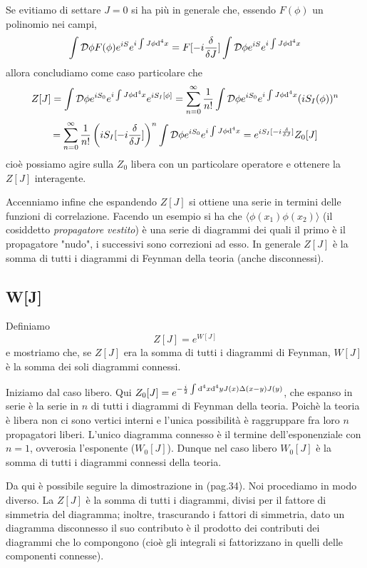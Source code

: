 \documentclass[a4paper, 11pt]{article}
\begin{document}
	Se evitiamo di settare $J=0$ si ha più in generale che, essendo $F(\phi)$ un polinomio nei campi,
	\[ \int \mathcal{D}\phi F(\phi) e^{iS}e^{i\int J\phi \mathrm{d}^4x} = F[-i\frac{\delta}{\delta J}] \int \mathcal{D}\phi e^{iS}e^{i\int J \phi \mathrm{d}^4x} \]
	allora concludiamo come caso particolare che
	\[ Z[J] = \int \mathcal{D}\phi e^{iS_0}e^{i\int J\phi \mathrm{d}^4x} e^{iS_I[\phi]} = \sum_{n=0}^{\infty} \frac{1}{n!} \int \mathcal{D}\phi e^{iS_0}e^{i\int J\phi \mathrm{d}^4x} (iS_I(\phi))^n \]
	\[ = \sum_{n=0}^{\infty} \frac{1}{n!} \left(iS_I[-i\frac{\delta}{\delta J}]\right)^n \int \mathcal{D}\phi e^{iS_0}e^{i\int J\phi \mathrm{d}^4x} = 
	e^{iS_I[-i\frac{\delta}{\delta J}]} Z_0[J] \]
	cioè possiamo agire sulla $Z_0$ libera con un particolare operatore e ottenere la $Z[J]$ interagente.
	
	Accenniamo infine che espandendo $Z[J]$ si ottiene una serie in termini delle funzioni di correlazione. Facendo un esempio si ha che $\langle \phi(x_1) \phi(x_2)\rangle$ (il cosiddetto \emph{propagatore vestito}) è una serie di diagrammi dei quali il primo è il propagatore "nudo", i successivi sono correzioni ad esso. In generale $Z[J]$ è la somma di tutti i diagrammi di Feynman della teoria (anche disconnessi).
	
	\subsection{W[J]}
	Definiamo
	\[ Z[J] = e^{W{[J]}} \]
	e mostriamo che, se $Z[J]$ era la somma di tutti i diagrammi di Feynman, $W[J]$ è la somma dei soli diagrammi connessi.
	
	Iniziamo dal caso libero. Qui $Z_0[J] = e^{-\frac{i}{2}\int \mathrm{d}^4 x \mathrm{d}^4 y J(x)\Delta(x-y)J(y)}$, che espanso in serie è la serie in $n$ di tutti i diagrammi di Feynman della teoria. Poichè la teoria è libera non ci sono vertici interni e l'unica possibilità è raggruppare fra loro $n$ propagatori liberi. L'unico diagramma connesso è il termine dell'esponenziale con $n=1$, ovverosia l'esponente ($W_0[J]$).
	Dunque nel caso libero $W_0[J]$ è la somma di tutti i diagrammi connessi della teoria.
	
	Da qui è possibile seguire la dimostrazione in \cite{anselmi} (pag.34). Noi procediamo in modo diverso. La $Z[J]$ è la somma di tutti i diagrammi, divisi per il fattore di simmetria del diagramma; inoltre, trascurando i fattori di simmetria, dato un diagramma disconnesso il suo contributo è il prodotto dei contributi dei diagrammi che lo compongono (cioè gli integrali si fattorizzano in quelli delle componenti connesse).
	
\end{document}
